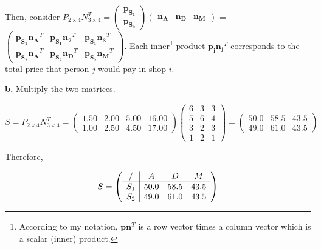 \documentclass{article}
\begin{document}
Then, consider $P_{2\times4}N_{3\times4}^{T} = \begin{pmatrix}
    \mathbf{p_{S_{1}}} \\
    \mathbf{p_{S_{2}}}
  \end{pmatrix} \begin{pmatrix}
    \mathbf{n_{A}} &
    \mathbf{n_{D}} &
    \mathbf{n_{M}}
  \end{pmatrix} $ =
  $\begin{pmatrix}
    \mathbf{p_{S_{1}}} \mathbf{n_{A}}^{T} & \mathbf{p_{S_{1}}} \mathbf{n_{2}}^{T} & \mathbf{p_{S_{1}}} \mathbf{n_{3}}^{T} \\
    \mathbf{p_{S_{2}}} \mathbf{n_{A}}^{T} & \mathbf{p_{S_{2}}} \mathbf{n_{D}}^{T} & \mathbf{p_{S_{2}}} \mathbf{n_{M}}^{T}
  \end{pmatrix}$. Each inner\footnote{According to my notation, $\mathbf{p} \mathbf{n}^{T}$ is a row vector times a column vector which is a scalar (inner) product.} product $\mathbf{p_{i}}\mathbf{n_{j}}^{T}$ corresponds to the total price that person $j$ would pay in shop $i$.

\textbf{b.} Multiply the two matrices.

\begin{equation*}
  S = P_{2\times4}N_{3\times4}^{T} =
  \begin{pmatrix}
    1.50 & 2.00 & 5.00 & 16.00 \\
    1.00 & 2.50 & 4.50 & 17.00
  \end{pmatrix}
  \begin{pmatrix}
    6 & 3 & 3 \\
    5 & 6 & 4 \\
    3 & 2 & 3 \\
    1 & 2 & 1
  \end{pmatrix} =
  \begin{pmatrix}
    50.0 & 58.5 & 43.5 \\
    49.0 & 61.0 & 43.5  
  \end{pmatrix}
\end{equation*}

Therefore,

\begin{equation*}
  S =
  \left(
    \begin{array}{c|c c c}
      /     & A   & D & M \\ \hline
      S_{1} & 50.0 & 58.5 & 43.5 \\
      S_{2} & 49.0 & 61.0 & 43.5
    \end{array}
  \right)
\end{equation*}
\end{document}
